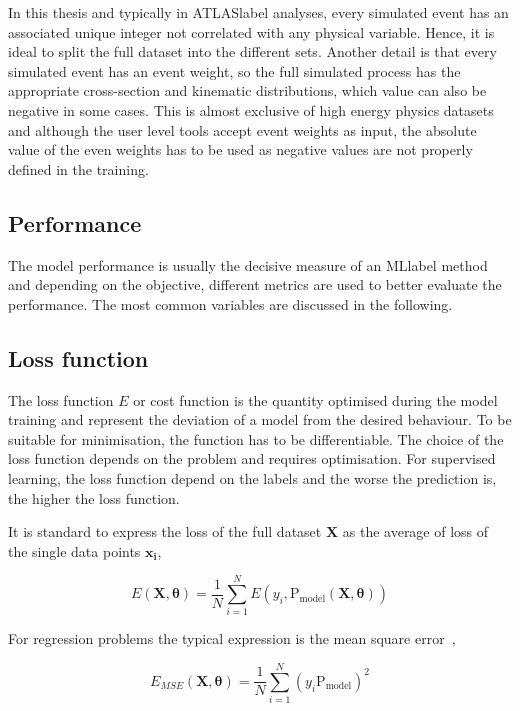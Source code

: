 In this thesis and typically in \acrshort{ATLASlabel} analyses, every simulated event has an associated unique integer not correlated with any physical variable. Hence, it is ideal to split the full dataset into the different sets. Another detail is that every simulated event has an event weight, so the full simulated process has the appropriate cross-section and kinematic distributions, which value can also be negative in some cases. This is almost exclusive of high energy physics datasets and although the user level tools accept event weights as input, the absolute value of the even weights has to be used as negative values are not properly defined in the training. 

\subsection{Performance}

The model performance is usually the decisive measure of an \acrshort{MLlabel} method and depending on the objective, different metrics are used to better evaluate the performance. The most common variables are discussed in the following.

\subsection{Loss function}

The loss function $E$ or cost function is the quantity optimised during the model training and represent the deviation of a model from the desired behaviour. To be suitable for minimisation, the function has to be differentiable. The choice of the loss function depends on the problem and requires optimisation. For supervised learning, the loss function depend on the labels and the worse the prediction is, the higher the loss function.

It is standard to express the loss of the full dataset $\mathbf{X}$ as the average of loss of the single data points $\mathbf{x_i}$,

\begin{equation}
    E(\mathbf{X},\boldsymbol{\theta})=\frac{1}{N}\sum_{i=1}^NE(y_i,\text{P}_\text{model}(\mathbf{X},\boldsymbol{\theta}))
\end{equation}

For regression problems the typical expression is the mean square error~\cite{EncyclopediaofML}, 

\begin{equation}
    E_{MSE}(\mathbf{X},\boldsymbol{\theta}) = \frac{1}{N}\sum_{i=1}^N (y_i\text{P}_\text{model})^2
\end{equation}

